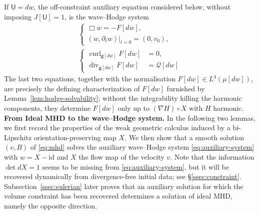 \documentclass[11pt,reqno]{amsart}
\theoremstyle{plain}
\theoremstyle{definition}
\theoremstyle{remark}
\numberwithin{equation}{section}
\DeclareMathOperator{\Div}{div}
\DeclareMathOperator{\curl}{curl}
\newcommand{\Ufield}{\mathsf U}
\newcommand{\gmetric}{\mathbf g}
\begin{document}
If $\Ufield=dw$, the off-constraint auxiliary equation considered below, without imposing $J[\Ufield]=1$, is
the wave--Hodge system
\begin{subequations}\label{eq:auxiliary-system}
\begin{align}
&
\begin{cases}
    \Box w=-F[dw],\\
    (w,\partial_tw)|_{t=0}=(0,v_0),
\end{cases}\\
 &
 \begin{cases}
  \curl_{\gmetric[dw]}F[dw]&=0,\\
  \Div_{\gmetric[dw]}F[dw]&=\mathcal Q[dw]
 \end{cases}
 &\label{eq:force-hodge}
\end{align}
\end{subequations}
The last two equations, together with the normalisation
$F[dw]\in L^4(\mu[dw])$, are precisely the defining characterization of
$F[dw]$ furnished by Lemma~\ref{lem:hodge-solvability}; without the
integrability killing the harmonic components, they determine $F[dw]$ only up to $(\nabla H)\circ X$ with $H$
harmonic.\\

\textbf{From Ideal MHD to the wave--Hodge system.} In the following two lemmas, we first record the properties of the weak geometric calculus induced by a bi-Lipschitz orientation-preserving map $X$. We then show that a smooth solution $(v,B)$ of \eqref{eq:mhd} solves the auxiliary wave--Hodge system \eqref{eq:auxiliary-system} with $w=X-\textrm{id}$ and $X$ the flow map of the velocity $v$. Note that the information $\det d X=1$ seems to be missing from \eqref{eq:auxiliary-system}, but it will be recovered dynamically from divergence-free initial data; see \S \ref{ssec:constraint}. Subsection~\ref{ssec:eulerian} later proves that an auxiliary solution for
which the volume constraint has been recovered determines a solution of
ideal MHD, namely the opposite direction.
\end{document}
